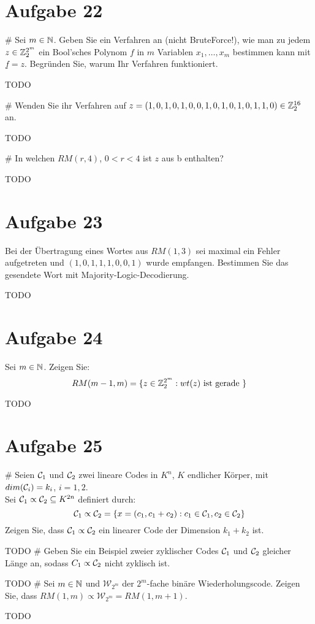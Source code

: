 
\setcounter{MaxMatrixCols}{20}

\section*{Aufgabe 22}
\begin{myList}
#
Sei $m \in \mathbb{N}$. Geben Sie ein Verfahren an (nicht BruteForce!), wie man zu jedem $z \in \mathbb{Z}^{2^m}_2$ ein Bool'sches Polynom $f$ in $m$ Variablen $x_1,\ldots,x_m$ bestimmen kann mit $\underline{f} = z$. Begründen Sie, warum Ihr Verfahren funktioniert.\medskip

TODO

#
Wenden Sie ihr Verfahren auf $z = (1,0,1,0,1,0,0,1,0,1,0,1,0,1,1,0) \in \mathbb{Z}^{16}_{2}$ an.\medskip

TODO

#
In welchen $RM(r,4)$, $0 < r < 4$ ist $z$ aus b enthalten?\medskip

TODO
\end{myList}

\section*{Aufgabe 23}
Bei der Übertragung eines Wortes aus $RM(1,3)$ sei maximal ein Fehler aufgetreten und $(1,0,1,1,1,0,0,1)$ wurde empfangen. Bestimmen Sie das gesendete Wort mit Majority-Logic-Decodierung.\medskip

TODO

\section*{Aufgabe 24}
Sei $m \in \mathbb{N}$. Zeigen Sie:
\begin{equation*}
	RM(m-1,m) = \lbrace z \in \mathbb{Z}^{2^m}_2 : wt(z) \text{ ist gerade } \rbrace
\end{equation*}

TODO

\section*{Aufgabe 25}
\begin{myList}
#
Seien $\mathcal{C}_1$ und $\mathcal{C}_2$ zwei lineare Codes in $K^n$, $K$ endlicher Körper, mit $dim(\mathcal{C}_i) = k_i$, $i = 1,2$.\\
Sei $\mathcal{C}_1 \propto \mathcal{C}_2 \subseteq K^{2n}$ definiert durch:
\begin{equation*}
	\mathcal{C}_1 \propto \mathcal{C}_2 = \lbrace x = (c_1, c_1 + c_2) : c_1 \in \mathcal{C}_1, c_2 \in \mathcal{C}_2 \rbrace
\end{equation*}
Zeigen Sie, dass $\mathcal{C}_1 \propto \mathcal{C}_2$ ein linearer Code der Dimension $k_1 + k_2$ ist.\medskip

TODO
#
Geben Sie ein Beispiel zweier zyklischer Codes $\mathcal{C}_1$ und $\mathcal{C}_2$ gleicher Länge an, sodass $C_1 \propto \mathcal{C}_2$ nicht zyklisch ist.\medskip

TODO
#
Sei $m \in \mathbb{N}$ und $\mathcal{W}_{2^m}$ der $2^m$-fache binäre Wiederholungscode. Zeigen Sie, dass $RM(1,m) \propto \mathcal{W}_{2^m} = RM(1,m+1)$.\medskip

TODO
\end{myList}

